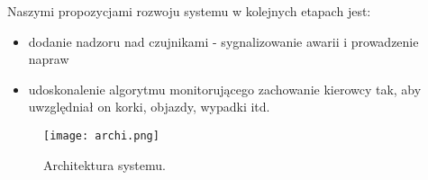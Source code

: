 Naszymi propozycjami rozwoju systemu w kolejnych etapach jest:
\begin{itemize}
\item dodanie nadzoru nad czujnikami - sygnalizowanie awarii i prowadzenie napraw
\item udoskonalenie algorytmu monitorującego zachowanie kierowcy tak, aby uwzględniał on korki, objazdy, wypadki itd.
\end{itemize}


\begin{figure}[H]
    \label{fig:architektura}
    \centering \texttt{[image: archi.png]}
    \caption{Architektura systemu.}
\end{figure}

